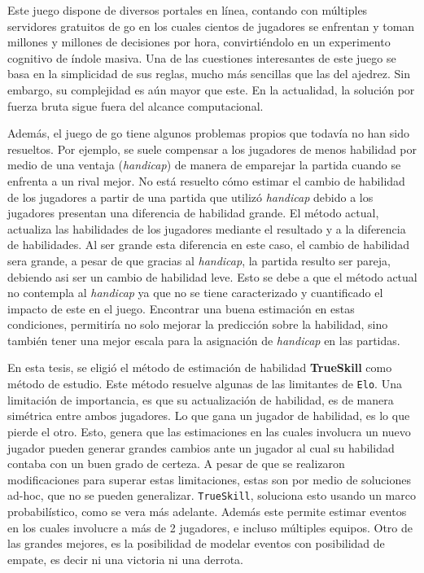 \documentclass[11pt,twoside, spanish]{report} %
\begin{document}
Este juego dispone de diversos portales en l\'inea, contando con m\'ultiples servidores gratuitos de go en los cuales cientos de jugadores se enfrentan y toman millones y millones de decisiones por hora, convirti\'endolo en un experimento cognitivo de \'indole masiva.
Una de las cuestiones interesantes de este juego se basa en la simplicidad de sus reglas, mucho m\'as sencillas que las del ajedrez.
Sin embargo, su complejidad es a\'un mayor que este.
En la actualidad, la soluci\'on por fuerza bruta sigue fuera del alcance computacional.


Adem\'as, el juego de go tiene algunos problemas propios que todav\'ia no han sido resueltos.
Por ejemplo, se suele compensar a los jugadores de menos habilidad por medio de una ventaja (\emph{handicap}) de manera de emparejar la partida cuando se enfrenta a un rival mejor.
No est\'a resuelto c\'omo estimar el cambio de habilidad de los jugadores a partir de una partida que utiliz\'o \emph{handicap} debido a los jugadores presentan una diferencia de habilidad grande.
El m\'etodo actual, actualiza las habilidades de los jugadores mediante el resultado y a la diferencia de habilidades.
Al ser grande esta diferencia en este caso, el cambio de habilidad sera grande, a pesar de que gracias al \emph{handicap}, la partida resulto ser pareja, debiendo asi ser un cambio de habilidad leve.
Esto se debe a que el m\'etodo actual no contempla al \emph{handicap} ya que no se tiene caracterizado y cuantificado el impacto de este en el juego.
Encontrar una buena estimaci\'on en estas condiciones, permitir\'ia no solo mejorar la predicci\'on sobre la habilidad, sino tambi\'en tener una mejor escala para la asignaci\'on de \emph{handicap} en las partidas.


En esta tesis, se eligi\'o el m\'etodo de estimaci\'on de habilidad \textbf{TrueSkill} como m\'etodo de estudio.
Este m\'etodo resuelve algunas de las limitantes de \texttt{Elo}.
Una limitaci\'on de importancia, es que su actualizaci\'on de habilidad, es de manera sim\'etrica entre ambos jugadores.
Lo que gana un jugador de habilidad, es lo que pierde el otro.
Esto, genera que las estimaciones en las cuales involucra un nuevo jugador pueden generar grandes cambios ante un jugador al cual su habilidad contaba con un buen grado de certeza.
A pesar de que se realizaron modificaciones para superar estas limitaciones, estas son por medio de soluciones ad-hoc, que no se pueden generalizar.
\texttt{TrueSkill}, soluciona esto usando un marco probabil\'istico, como se vera m\'as adelante.
Adem\'as este permite estimar eventos en los cuales involucre a m\'as de 2 jugadores, e incluso m\'ultiples equipos.
Otro de las grandes mejores, es la posibilidad de modelar eventos con posibilidad de empate, es decir ni una victoria ni una derrota.
\end{document}
